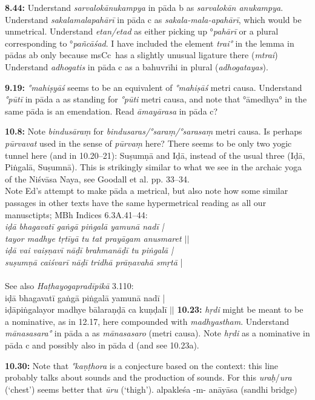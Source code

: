 \documentclass{article}
\newcommand{\vsnum}[1]{\textbf{#1}}
\newcommand{\skt}[1]{\textit{#1}}
\newcommand{\msCc}{msCc}
\newcommand{\Ed}{Ed}
\begin{document}
\vsnum{8.44: }Understand \skt{sarvalokānukampya} in pāda b as \skt{sarvalokān anukampya}. Understand \skt{sakalamalapahārī} in pāda c as \skt{sakala-mala-apahārī}, which would be unmetrical. Understand \skt{etan/etad} as either picking up °\skt{pahārī} or a plural corresponding to °\skt{pañcāśad}. 
I have included the element \skt{trai°} in the lemma in pādas ab only because \msCc\ has a slightly unusual ligature there (\skt{mtrai}) Understand \skt{adhogatis} in pāda c as a bahuvrīhi in plural (\skt{adhogatayas}).

\vsnum{9.19: }\skt{°mahiṣyāś} seems to be an equivalent of \skt{°mahiṣāś} metri causa. Understand \skt{°pūtī} in pāda a as standing for \skt{°pūti} metri causa, and note that °āmedhya° in the same pāda is an emendation. Read \skt{āmayārasa} in pāda c?


\vsnum{10.8: }Note \skt{bindusāraṃ} for \skt{bindusaras/°saraṃ/°sarasaṃ} metri causa. Is perhaps \skt{pūrvavat} used in the sense of \skt{pūrvaṃ} here? There seems to be only two yogic tunnel here (and in 10.20--21): Suṣumṇā and Iḍā, instead of the usual three (Iḍā, Piṅgalā, Suṣumnā). This is strikingly similar to what we see in the archaic yoga of the Niśvāsa Naya, see Goodall et al. pp. 33--34. \\ Note \Ed's attempt to make pāda a metrical, but also note how some similar passages in other texts have the same hypermetrical reading as all our manusctipts; MBh Indices 6.3A.41--44:\\ \skt{iḍā bhagavatī gaṅgā piṅgalā yamunā nadī |\\ tayor madhye tṛtīyā tu tat prayāgam anusmaret $||$\\ iḍā vai vaiṣṇavī nāḍī brahmanāḍī tu piṅgalā |\\ suṣumṇā caiśvarī nāḍī tridhā prāṇavahā smṛtā} |\\ \\ See also \skt{Haṭhayogapradīpikā} 3.110: \\ iḍā bhagavatī gaṅgā piṅgalā yamunā nadī |\\ iḍāpiṅgalayor madhye bālaraṇḍā ca kuṇḍalī $||$  \vsnum{10.23: }\skt{hṛdi} might be meant to be a nominative, as in 12.17, here compounded with \skt{madhyastham}. Understand \skt{mānasasara°} in pāda a as \skt{mānasasaro} (metri causa). Note \skt{hṛdi} as a nominative in pāda c and possibly also in pāda d (and see 10.23a).

\vsnum{10.30: }Note that \skt{°kaṇṭhora} is a conjecture based on the context: this line probably talks about sounds and the production of sounds. For this \skt{uraḥ}/\skt{ura} (`chest') seems better that \skt{ūru} (`thigh'). 
alpakleśa -m- anāyāsa (sandhi bridge)
\end{document}
